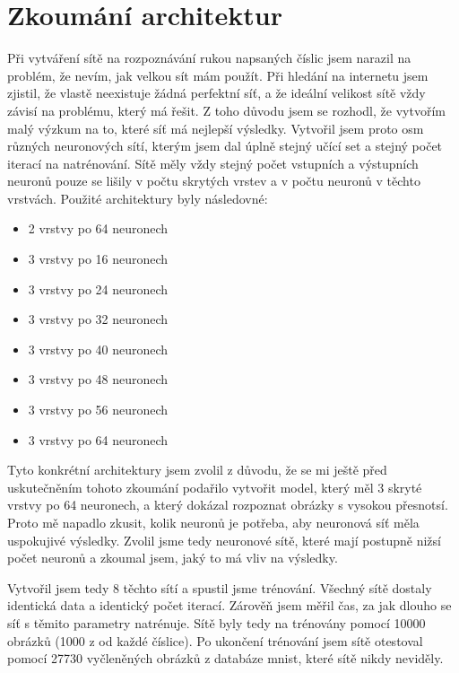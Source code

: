 \section{Zkoumání architektur}
Při vytváření sítě na rozpoznávání rukou napsaných číslic jsem narazil na problém, že nevím, jak velkou sít mám použít.
Při hledání na internetu jsem zjistil, že vlastě neexistuje žádná perfektní síť, a že ideální velikost sítě vždy závisí na problému, který má řešit.
Z toho důvodu jsem se rozhodl, že vytvořím malý výzkum na to, které síť má nejlepší výsledky.
Vytvořil jsem proto osm různých neuronových sítí, kterým jsem dal úplně stejný učící set a stejný počet iterací na natrénování.
Sítě měly vždy stejný počet vstupních a výstupních neuronů pouze se lišily v počtu skrytých vrstev a v počtu neuronů v těchto vrstvách.
Použité architektury byly následovné:
\begin{itemize}
    \item 2 vrstvy po 64 neuronech
    \item 3 vrstvy po 16 neuronech
    \item 3 vrstvy po 24 neuronech
    \item 3 vrstvy po 32 neuronech
    \item 3 vrstvy po 40 neuronech
    \item 3 vrstvy po 48 neuronech
    \item 3 vrstvy po 56 neuronech
    \item 3 vrstvy po 64 neuronech
\end{itemize}
Tyto konkrétní architektury jsem zvolil z důvodu, že se mi ještě před uskutečněním tohoto zkoumání podařilo vytvořit model,
který měl 3 skryté vrstvy po 64 neuronech, a který dokázal rozpoznat obrázky s vysokou přesnotsí.
Proto mě napadlo zkusit, kolik neuronů je potřeba, aby neuronová síť měla uspokujivé výsledky.
Zvolil jsme tedy neuronové sítě, které mají postupně nižsí počet neuronů a zkoumal jsem, jaký to má vliv na výsledky.

Vytvořil jsem tedy 8 těchto sítí a spustil jsme trénování. Všechný sítě dostaly identická data a identický počet iterací.
Zárověň jsem měřil čas, za jak dlouho se síť s těmito parametry natrénuje. Sítě byly tedy na trénovány pomocí 10000 obrázků (1000 z od každé číslice).
Po ukončení trénování jsem sítě otestoval pomocí 27730 vyčleněných obrázků z databáze mnist, které sítě nikdy neviděly.

